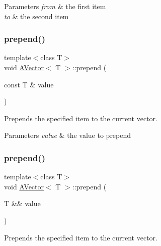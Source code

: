 \begin{DoxyParams}{Parameters}
{\em from} & the first item \\
\hline
{\em to} & the second item \\
\hline
\end{DoxyParams}
\mbox{\label{class_a_vector_a5b7910c1c1dce6877a21f9c5cba4bfc2}} 
\subsubsection{\texorpdfstring{prepend()}{prepend()}\hspace{0.1cm}{\footnotesize\ttfamily [1/2]}}
{\footnotesize\ttfamily template$<$class T$>$ \\
void \mbox{\hyperlink{class_a_vector}{A\+Vector}}$<$ T $>$\+::prepend (\begin{DoxyParamCaption}\item[{const T \&}]{value }\end{DoxyParamCaption})}



Prepends the specified item to the current vector. 


\begin{DoxyParams}{Parameters}
{\em value} & the value to prepend \\
\hline
\end{DoxyParams}
\mbox{\label{class_a_vector_a13f40bde5b40222d98fe0982eaca9513}} 
\subsubsection{\texorpdfstring{prepend()}{prepend()}\hspace{0.1cm}{\footnotesize\ttfamily [2/2]}}
{\footnotesize\ttfamily template$<$class T$>$ \\
void \mbox{\hyperlink{class_a_vector}{A\+Vector}}$<$ T $>$\+::prepend (\begin{DoxyParamCaption}\item[{T \&\&}]{value }\end{DoxyParamCaption})}



Prepends the specified item to the current vector. 


